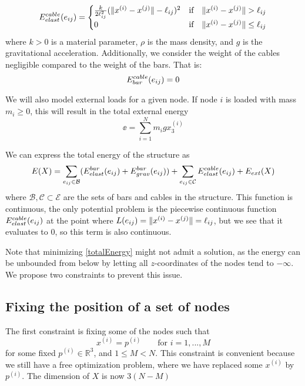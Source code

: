 \begin{equation}
E^{cable}_{elast}(e_{ij}) = \begin{cases}
    \frac{k}{2\ell_{ij}^2}(\lVert x^{(i)} - x^{(j)}\rVert-\ell_{ij})^2 & \text{if} \quad \lVert x^{(i)} - x^{(j)}\rVert >\ell_{ij}\\
    0 & \text{if} \quad \lVert x^{(i)} - x^{(j)}\rVert \leq \ell_{ij}
    \end{cases}
    \label{cableElast}
\end{equation}
where $k > 0$ is a material parameter, $\rho$ is the mass density, and $g$ is the gravitational acceleration. Additionally, we consider the weight of the cables negligible compared to the weight of the bars. That is:
\begin{equation}
    E^{cable}_{bar}(e_{ij}) = 0
    \label{cableGrav}
\end{equation}

We will also model external loads for a given node. If node $i$ is loaded with mass $m_i \geq 0$, this will result in the total external energy
\begin{equation}
    \ee = \sum_{i=1}^{N} m_i g x_3^{(i)}
    \label{externalEnergy}
\end{equation}

We can express the total energy of the structure as \begin{equation}
    E(X) = \sum\limits_{e_{ij} \in \mathcal{B}}(E^{bar}_{elast}(e_{ij}) + E^{bar}_{grav}(e_{ij})) + \sum\limits_{e_{ij} \in \mathcal{C}} E^{cable}_{elast}(e_{ij}) + E_{ext}(X)
    \label{totalEnergy}
\end{equation} where $\mathcal{B}, \mathcal{C} \subset \mathcal{E}$ are the sets of bars and cables in the structure. This function is continuous, the only potential problem is the piecewise continuous function $E^{cable}_{elast}(e_{ij})$ at the point where $L(e_{ij}) = \lVert x^{(i)} - x^{(j)}\rVert = \ell_{ij}$, but we see that it evaluates to $0$, so this term is also continuous.

Note that minimizing \eqref{totalEnergy} might not admit a solution, as the energy can be unbounded from below by letting all $z$-coordinates of the nodes tend to $-\infty$. We propose two constraints to prevent this issue.

\subsection{Fixing the position of a set of nodes}
The first constraint is fixing some of the nodes such that
\begin{equation}
    x^{(i)} = p^{(i)} \qquad \text{for } i = 1,...,M
    \label{fixednode}
\end{equation} for some fixed $p^{(i)} \in \mathbb{R}^3$, and $1\leq M < N$. This constraint is convenient because we still have a free optimization problem, where we have replaced some $x^{(i)}$ by $p^{(i)}$. The dimension of $X$ is now $3(N-M)$

